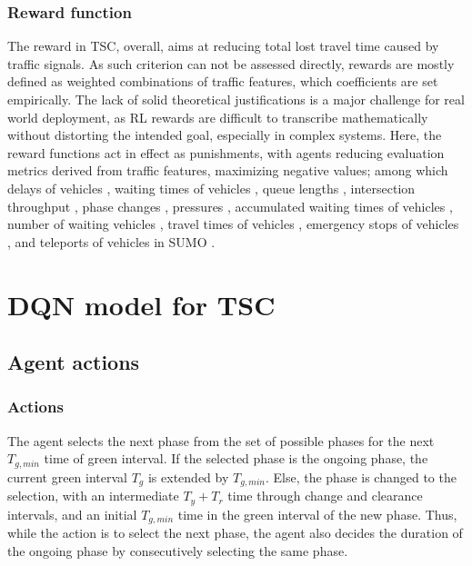 \documentclass[journal]{IEEEtran}
\begin{document}
\subsubsection{Reward function}
The reward in TSC, overall, aims at reducing total lost travel time caused by traffic signals. As such criterion can not be assessed directly, rewards are mostly defined as weighted combinations of traffic features, which coefficients are set empirically. The lack of solid theoretical justifications is a major challenge for real world deployment, as RL rewards are difficult to transcribe mathematically without distorting the intended goal, especially in complex systems. Here, the reward functions act in effect as punishments, with agents reducing evaluation metrics derived from traffic features, maximizing negative values; among which delays of vehicles \cite{genders2019opensource,wei2018intellilight,pol2016coordinated,zhang2020using,zhang2019partially,genders2018evaluating,touhbi2017adaptative}, waiting times of vehicles \cite{gao2017adaptative,liang2019deep,wei2018intellilight,alemzadeh2020adaptative,pol2016coordinated}, queue lengths \cite{li2016traffic,wei2018intellilight,wei2019colight,touhbi2017adaptative}, intersection throughput \cite{stevens2016reinforcement,wei2018intellilight,alemzadeh2020adaptative,touhbi2017adaptative}, phase changes \cite{wei2018intellilight,alemzadeh2020adaptative,pol2016coordinated}, pressures \cite{wei2019presslight,chen2020toward}, accumulated waiting times of vehicles \cite{vidali2019deep}, number of waiting vehicles \cite{alemzadeh2020adaptative}, travel times of vehicles \cite{wei2018intellilight}, emergency stops  of vehicles \cite{pol2016coordinated}, and teleports of vehicles in SUMO \cite{pol2016coordinated}.

\section{DQN model for TSC}
\label{sec:model}

\subsection{Agent actions}

\subsubsection{Actions}
The agent selects the next phase from the set of possible phases for the next $T_{g,min}$ time of green interval. If the selected phase is the ongoing phase, the current green interval $T_g$ is extended by $T_{g,min}$. Else, the phase is changed to the selection, with an intermediate $T_y+T_r$ time through change and clearance intervals, and an initial $T_{g,min}$ time in the green interval of the new phase. Thus, while the action is to select the next phase, the agent also decides the duration of the ongoing phase by consecutively selecting the same phase.
\\
\end{document}

